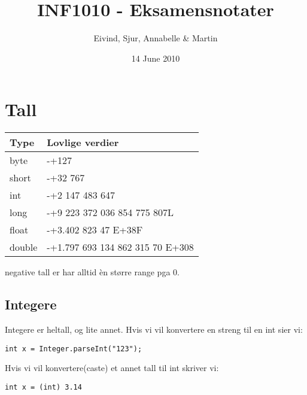 \documentclass[a4paper,norsk,10pt]{article}
\title{INF1010 - Eksamensnotater}
\author{Eivind, Sjur, Annabelle & Martin}
\date{14 June 2010}
\begin{document}
\maketitle

\setcounter{tocdepth}{3}
\tableofcontents
\vspace*{1cm}
\section{Tall}
\label{sec-1}



\begin{center}
\begin{tabular}{ll}
\hline
 \textbf{Type}  &  \textbf{Lovlige verdier}          \\
\hline
 byte           &  -+127                             \\
\hline
 short          &  -+32 767                          \\
\hline
 int            &  -+2 147 483 647                   \\
\hline
 long           &  -+9 223 372 036 854 775 807L      \\
\hline
 float          &  -+3.402 823 47 E+38F              \\
\hline
 double         &  -+1.797 693 134 862 315 70 E+308  \\
\hline
\end{tabular}
\end{center}



  negative tall er har alltid èn større range pga 0. 
\subsection{Integere}
\label{sec-1.1}


   Integere er heltall, og lite annet.
   Hvis vi vil konvertere en streng til en int sier vi:
\begin{verbatim}
int x = Integer.parseInt("123");
\end{verbatim}
   Hvis vi vil konvertere(caste) et annet tall til int skriver vi:
\begin{verbatim}
int x = (int) 3.14
\end{verbatim}
\end{document}
